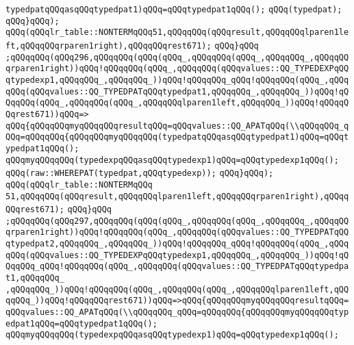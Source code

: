 \verb|typedpatqQQqasqQQqtypedpat1)qQQq=qQQqtypedpat1qQQq();|\newline
\verb|qQQq(typedpat);|\newline
\verb|qQQq}qQQq);|\newline
\verb|qQQq(qQQqlr_table::NONTERMqQQq51,qQQqqQQq(qQQqresult,qQQqqQQqlparen1left,qQQqqQQqrparen1right),qQQqqQQqrest671);|\newline
\verb|qQQq}qQQq|\newline
\verb|;qQQqqQQq(qQQq296,qQQqqQQq(qQQq(qQQq_,qQQqqQQq(qQQq_,qQQqqQQq_,qQQqqQQqrparen1right))qQQq!qQQqqQQq(qQQq_,qQQqqQQq(qQQqvalues::QQ_TYPEDEXPqQQqtypedexp1,qQQqqQQq_,qQQqqQQq_))qQQq!qQQqqQQq_qQQq!qQQqqQQq(qQQq_,qQQqqQQq(qQQqvalues::QQ_TYPEDPATqQQqtypedpat1,qQQqqQQq_,qQQqqQQq_))qQQq!qQQqqQQq(qQQq_,qQQqqQQq(qQQq_,qQQqqQQqlparen1left,qQQqqQQq_))qQQq!qQQqqQQqrest671))qQQq=>|\newline
\verb|qQQq{qQQqqQQqmyqQQqqQQqresultqQQq=qQQqvalues::QQ_APATqQQq(\\qQQqqQQq_qQQq=qQQqqQQq{qQQqqQQqmyqQQqqQQq(typedpatqQQqasqQQqtypedpat1)qQQq=qQQqtypedpat1qQQq();|\newline
\verb|qQQqmyqQQqqQQq(typedexpqQQqasqQQqtypedexp1)qQQq=qQQqtypedexp1qQQq();|\newline
\verb|qQQq(raw::WHEREPAT(typedpat,qQQqtypedexp));|\newline
\verb|qQQq}qQQq);|\newline
\verb|qQQq(qQQqlr_table::NONTERMqQQq|\newline
\verb|51,qQQqqQQq(qQQqresult,qQQqqQQqlparen1left,qQQqqQQqrparen1right),qQQqqQQqrest671);|\newline
\verb|qQQq}qQQq|\newline
\verb|;qQQqqQQq(qQQq297,qQQqqQQq(qQQq(qQQq_,qQQqqQQq(qQQq_,qQQqqQQq_,qQQqqQQqrparen1right))qQQq!qQQqqQQq(qQQq_,qQQqqQQq(qQQqvalues::QQ_TYPEDPATqQQqtypedpat2,qQQqqQQq_,qQQqqQQq_))qQQq!qQQqqQQq_qQQq!qQQqqQQq(qQQq_,qQQqqQQq(qQQqvalues::QQ_TYPEDEXPqQQqtypedexp1,qQQqqQQq_,qQQqqQQq_))qQQq!qQQqqQQq_qQQq!qQQqqQQq(qQQq_,qQQqqQQq(qQQqvalues::QQ_TYPEDPATqQQqtypedpat1,qQQqqQQq_|\newline
\verb|,qQQqqQQq_))qQQq!qQQqqQQq(qQQq_,qQQqqQQq(qQQq_,qQQqqQQqlparen1left,qQQqqQQq_))qQQq!qQQqqQQqrest671))qQQq=>qQQq{qQQqqQQqmyqQQqqQQqresultqQQq=qQQqvalues::QQ_APATqQQq(\\qQQqqQQq_qQQq=qQQqqQQq{qQQqqQQqmyqQQqqQQqtypedpat1qQQq=qQQqtypedpat1qQQq();|\newline
\verb|qQQqmyqQQqqQQq(typedexpqQQqasqQQqtypedexp1)qQQq=qQQqtypedexp1qQQq();|\newline
